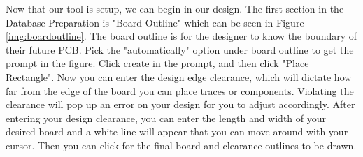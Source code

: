 Now that our tool is setup, we can begin in our design. The first section in the Database Preparation is "Board Outline" which can be seen
in Figure \ref{img:boardoutline}. The board outline is for the designer to know the boundary of their future PCB.
Pick the "automatically" option under board outline to get the prompt in the figure. Click create in the prompt,
and then click "Place Rectangle". Now you can enter the design edge clearance, which will dictate how far from the edge of the board you can
place traces or components. Violating the clearance will pop up an error on your design for you to adjust accordingly. After entering your
design clearance, you can enter the length and width of your desired board and a white line will appear that you can move around with your cursor.
Then you can click for the final board and clearance outlines to be drawn.

